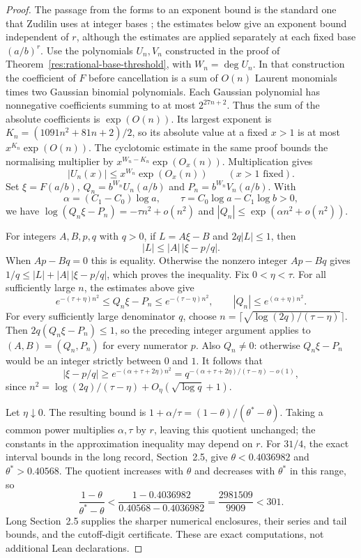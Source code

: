 \documentclass[11pt]{article}
\begin{document}
\begin{proof}
The passage from the forms to an exponent bound is the standard one that
Zudilin uses at integer bases \cite[p.~162]{zudilin2004}; the estimates below
give an exponent bound independent of $r$, although the estimates are
applied separately at each fixed base $(a/b)^r$.
Use the polynomials $U_n,V_n$ constructed in the proof of
Theorem~\ref{res:rational-base-threshold}, with $W_n=\deg U_n$.
In that construction the coefficient of $F$ before cancellation is a
sum of $O(n)$ Laurent monomials times two Gaussian binomial polynomials.
Each Gaussian polynomial has nonnegative coefficients summing to at
most $2^{27n+2}$. Thus the sum of the absolute coefficients is
$\exp(O(n))$. Its largest exponent is
$K_n=(1091n^2+81n+2)/2$, so its absolute value at a fixed $x>1$ is at
most $x^{K_n}\exp(O(n))$. The cyclotomic estimate in the same proof
bounds the normalising multiplier by
$x^{W_n-K_n}\exp(O_x(n))$. Multiplication gives
\[
 |U_n(x)|\le x^{W_n}\exp(O_x(n))\qquad(x>1\text{ fixed}).
\]
Set $\xi=F(a/b)$, $Q_n=b^{W_n}U_n(a/b)$ and
$P_n=b^{W_n}V_n(a/b)$.  With
\[
 \alpha=(C_1-C_0)\log a,\qquad
 \tau=C_0\log a-C_1\log b>0,
\]
we have $\log(Q_n\xi-P_n)=-\tau n^2+o(n^2)$ and
$|Q_n|\le\exp(\alpha n^2+o(n^2))$.

For integers $A,B,p,q$ with $q>0$, if $L=A\xi-B$ and $2q|L|\le1$, then
\[
 |L|\le |A|\,|\xi-p/q|.
\]
When $Ap-Bq=0$ this is equality.  Otherwise the nonzero integer $Ap-Bq$
gives $1/q\le |L|+|A|\,|\xi-p/q|$, which proves the inequality.
Fix $0<\eta<\tau$. For all sufficiently large $n$, the estimates above give
\[
 e^{-(\tau+\eta)n^2}\le Q_n\xi-P_n\le e^{-(\tau-\eta)n^2},
 \qquad |Q_n|\le e^{(\alpha+\eta)n^2}.
\]
For every sufficiently large denominator $q$, choose
$n=\lceil\sqrt{\log(2q)/(\tau-\eta)}\rceil$. Then
$2q(Q_n\xi-P_n)\le1$, so the preceding integer argument applies to
$(A,B)=(Q_n,P_n)$ for every numerator $p$. Also $Q_n\ne0$: otherwise
$Q_n\xi-P_n$ would be an integer strictly between $0$ and $1$.
It follows that
\[
 |\xi-p/q|\ge e^{-(\alpha+\tau+2\eta)n^2}
             =q^{-(\alpha+\tau+2\eta)/(\tau-\eta)-o(1)},
\]
since $n^2=\log(2q)/(\tau-\eta)+O_\eta(\sqrt{\log q}+1)$.

Let $\eta\downarrow0$.  The resulting bound is
$1+\alpha/\tau=(1-\theta)/(\theta^*-\theta)$.
Taking a common power multiplies $\alpha,\tau$ by $r$, leaving this quotient
unchanged; the constants in the approximation inequality may depend on $r$.
For $31/4$, the exact interval bounds in the long record, Section~2.5,
give $\theta<0.4036982$ and $\theta^*>0.40568$. The quotient increases
with $\theta$ and decreases with $\theta^*$ in this range, so
\[
 \frac{1-\theta}{\theta^*-\theta}
 <\frac{1-0.4036982}{0.40568-0.4036982}
 =\frac{2981509}{9909}<301.
\]
Long Section~2.5 supplies the sharper numerical enclosures, their
series and tail bounds, and the cutoff-digit certificate. These are
exact computations, not additional Lean declarations.
\end{proof}
\end{document}
